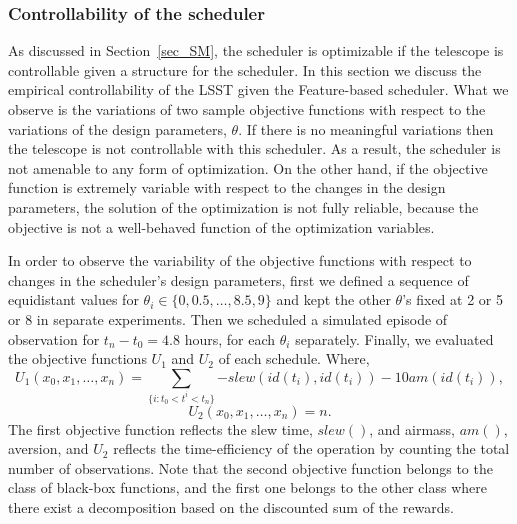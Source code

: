 \documentclass[12pt]{aastex62}
\theoremstyle{definition}
\begin{document}
\subsubsection{Controllability of the scheduler}\label{sec_sim_cont}
As discussed in Section~\ref{sec_SM}, the scheduler is optimizable if the telescope is controllable given a structure for the scheduler. In this section we discuss the empirical controllability of the LSST given the Feature-based scheduler. What we observe is the variations of two sample objective functions with respect to the variations of the design parameters, $\theta$. If there is no meaningful variations then the telescope is not controllable with this scheduler. As a result, the scheduler is not amenable to any form of optimization. On the other hand, if the objective function is extremely variable with respect to the changes in the design parameters, the solution of the optimization is not fully reliable, because the objective is not a well-behaved function of the optimization variables.

In order to observe the variability of the objective functions with respect to changes in the scheduler's design parameters, first we defined a sequence of equidistant values for $\theta_i \in \{ 0, 0.5, \dots, 8.5, 9\}$ and kept the other $\theta$'s fixed at 2 or 5 or 8 in separate experiments. Then we scheduled a simulated episode of observation for $t_n - t_0 = 4.8$ hours, for each $\theta_i$ separately. Finally, we evaluated the objective functions $U_1$ and $U_2$ of each schedule. Where,
%
\begin{equation}\label{equ_short_term_U1}
U_1(x_0,x_{1}, \dots, x_{n})= \sum_{\{i:t_0<t^i<t_n\}} {- slew(id(t_{i}), id(t_i)) -  10 am(id(t_i))},
\end{equation}
%
\begin{equation}\label{equ_short_term_U2}
U_2(x_0,x_{1}, \dots, x_{n})= n.
\end{equation}
%
The first objective function reflects the slew time, $slew()$, and airmass, $am()$, aversion, and $U_2$ reflects the time-efficiency of the operation by counting the total number of observations. Note that the second objective function belongs to the class of black-box functions, and the first one belongs to the other class where there exist a decomposition based on the discounted sum of the rewards.
\end{document}
